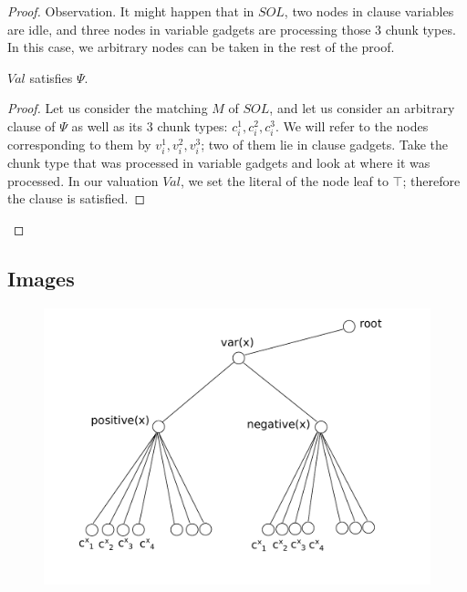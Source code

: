 \documentclass[9pt,twocolumn]{scrartcl}
\newcommand{\achunk}{c}
\newcommand{\Formula}{\ensuremath{\Psi}}
\newcommand{\Val}{\ensuremath{Val}}
\newcommand{\Sol}{\ensuremath{SOL}}
\begin{document}
\begin{appendix}
\begin{proof}
Observation. It might happen that in $\Sol$, two nodes in
clause variables are idle, and three nodes in variable gadgets are
processing those $3$ chunk types. In this case, we
arbitrary nodes can be taken in the rest
of the proof.

\begin{lemma}
$\Val$ satisfies $\Formula$.
\end{lemma}
\begin{proof}
Let us consider the matching $M$ of $\Sol$, and let us consider an arbitrary clause of
$\Formula$ as well as its $3$ chunk types: $\achunk_i^1, \achunk_i^2, \achunk_i^3$.
We will refer to the nodes corresponding to them
by $v_i^1, v_i^2, v_i^3$; two of them lie in clause gadgets.
Take the chunk type that was processed in variable
gadgets and look at where it was processed.
In our valuation $\Val$, we set the literal of the node leaf to
$\top$; therefore the clause is satisfied.
\end{proof}
\end{proof}

\subsection{Images}

\begin{figure}[htbp]
\includegraphics[width = \columnwidth]{figs/gadget-no-bw}
\end{figure}



\end{appendix}
\end{document}
